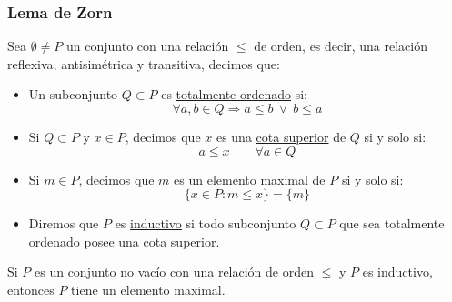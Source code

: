 \subsubsection{Lema de Zorn}
\begin{definicion}
    Sea $\emptyset \neq P$ un conjunto con una relación $\leq$ de orden, es decir, una relación reflexiva, antisimétrica y transitiva, decimos que:
    \begin{itemize}
        \item Un subconjunto $Q\subset P$ es \underline{totalmente ordenado} si:
            \begin{equation*}
                \forall a,b\in Q \Longrightarrow a\leq b\ \lor\ b\leq a
            \end{equation*}
        \item Si $Q\subset P$ y $x\in P$, decimos que $x$ es una \underline{cota superior} de $Q$ si y solo si:
            \begin{equation*}
                a\leq x \qquad \forall a\in Q
            \end{equation*}
        \item Si $m\in P$, decimos que $m$ es un \underline{elemento maximal} de $P$ si y solo si:
            \begin{equation*}
                \{x\in P : m \leq x\} = \{m\}
            \end{equation*}
        \item Diremos que $P$ es \underline{inductivo} si todo subconjunto $Q\subset P$ que sea totalmente ordenado posee una cota superior.
    \end{itemize}
\end{definicion}

\begin{lema}[de Zorn]
    Si $P$ es un conjunto no vacío con una relación de orden $\leq$ y $P$  es inductivo, entonces $P$ tiene un elemento maximal.
\end{lema}


